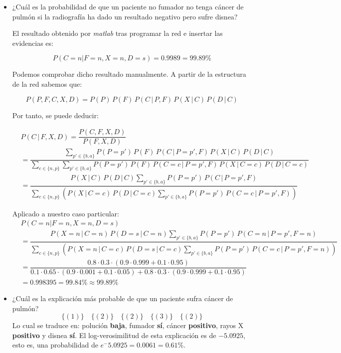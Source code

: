 \documentclass[a4paper]{article}
\begin{document}
\begin{itemize} 
\item ¿Cuál es la probabilidad de que un paciente no fumador no tenga cáncer de pulmón si la radiografía ha dado un resultado negativo pero sufre disnea?

El resultado obtenido por \textit{matlab} tras programar la red e insertar las evidencias es:

\[ P \left( C = n | F = n, X = n, D = s \right) = 0.9989 = 99.89\% \]

Podemos comprobar dicho resultado manualmente. A partir de la estructura de la red sabemos que:

\[ P(P, F, C, X, D) = P(P)\,P(F)\,P(C\,|\,P,F)\,P(X\,|\,C)\,P(D\,|\,C) \]

Por tanto, se puede deducir:

{\small \[ \begin{aligned}
&P(C\,|\,F,X,D) = \dfrac{P(C,F,X,D)}{P(F,X,D)} \\
&=\dfrac{ \sum\limits_{p\prime \in \lbrace b, a \rbrace} P(P=p\prime )\,P(F)\,P(C\,|\,P=p\prime ,F)\,P(X\,|\,C)\,P(D\,|\,C)}{ \sum\limits_{c \in \lbrace n, p \rbrace} \sum\limits_{p\prime \in \lbrace b, a \rbrace} P(P=p\prime )\,P(F)\,P(C=c\,|\,P=p\prime ,F)\,P(X\,|\,C=c)\,P(D\,|\,C=c)} \\
&= \dfrac{ P(X\,|\,C)\,P(D\,|\,C) \sum\limits_{p\prime \in \lbrace b, a \rbrace} P(P=p\prime )\,P(C\,|\,P=p\prime ,F)}{ \sum\limits_{c \in \lbrace n, p \rbrace} \left( P(X\,|\,C=c)\,P(D\,|\,C=c) \sum\limits_{p\prime \in \lbrace b, a \rbrace} P(P=p\prime )\,P(C=c\,|\,P=p\prime ,F) \right) } \end{aligned}  \]}

Aplicado a nuestro caso particular:
{\small \[ \begin{aligned}
&P \left( C = n | F = n, X = n, D = s \right) \\
&=\dfrac{ P(X=n\,|\,C=n)\,P(D=s\,|\,C=n) \sum\limits_{p\prime \in \lbrace b, a \rbrace} P(P=p\prime )\,P(C=n\,|\,P=p\prime ,F=n)}{ \sum\limits_{c \in \lbrace n, p \rbrace} \left( P(X=n\,|\,C=c)\,P(D=s\,|\,C=c) \sum\limits_{p\prime \in \lbrace b, a \rbrace} P(P=p\prime )\,P(C=c\,|\,P=p\prime ,F=n) \right) } \\
&= \dfrac{0.8 \cdot 0.3 \cdot (0.9 \cdot 0.999+0.1 \cdot 0.95)} {0.1 \cdot 0.65 \cdot (0.9 \cdot 0.001 + 0.1 \cdot 0.05) + 0.8 \cdot 0.3 \cdot (0.9 \cdot 0.999+0.1 \cdot 0.95) } \\
&= 0.998395 = 99.84\% \approx 99.89 \% \end{aligned} \]}



\item ¿Cuál es la explicación más probable de que un paciente sufra cáncer de pulmón?
\[ \lbrace \left( 1 \right) \rbrace \quad \lbrace \left( 2 \right) \rbrace \quad \lbrace \left( 2 \right) \rbrace \quad \lbrace \left( 3 \right) \rbrace \quad \lbrace \left( 2 \right) \rbrace \]
Lo cual se traduce en: polución \textbf{baja}, fumador \textbf{sí}, cáncer \textbf{positivo}, rayos X \textbf{positivo} y disnea \textbf{sí}. El log-verosimilitud de esta explicación es de $-5.0925$, esto es, una probabilidad de $e^-5.0925=0.0061=0.61\%$.
\end{itemize}
\end{document}
